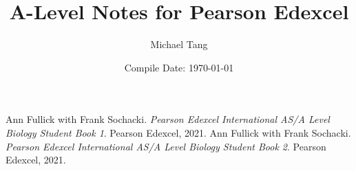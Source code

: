 \documentclass[15pt, a4paper]{book}
\title{A-Level Notes for Pearson Edexcel}
\author{Michael Tang}
\date{Compile Date: \today}
\begin{document}
\maketitle
\newpage

\tableofcontents
\newpage









\begin{thebibliography}{9}
 Ann Fullick with Frank Sochacki. \textit{Pearson Edexcel International AS/A Level Biology Student Book 1}. Pearson Edexcel, 2021.
 Ann Fullick with Frank Sochacki. \textit{Pearson Edexcel International AS/A Level Biology Student Book 2}. Pearson Edexcel, 2021.
\end{thebibliography}
\end{document}
